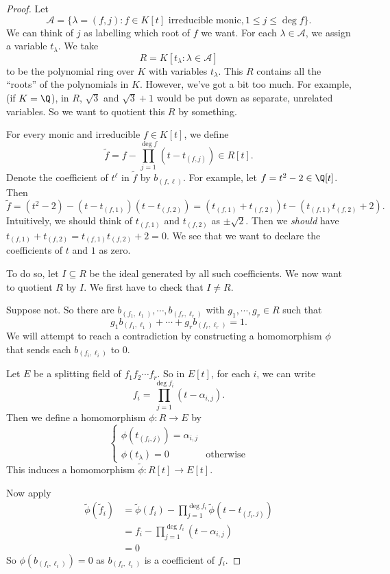 \documentclass[a4paper]{article}
\begin{document}
\begin{proof}
  Let
  \[
    \mathcal{A} = \{\lambda = (f, j): f\in K[t] \text{ irreducible monic}, 1 \leq j \leq \deg f\}.
  \]
  We can think of $j$ as labelling which root of $f$ we want. For each $\lambda \in \mathcal{A}$, we assign a variable $t_\lambda$. We take
  \[
    R = K[t_\lambda: \lambda \in \mathcal{A}]
  \]
  to be the polynomial ring over $K$ with variables $t_\lambda$. This $R$ contains all the ``roots'' of the polynomials in $K$. However, we've got a bit too much. For example, (if $K = \Q$), in $R$, $\sqrt{3}$ and $\sqrt{3} + 1$ would be put down as separate, unrelated variables. So we want to quotient this $R$ by something.

  For every monic and irreducible $f \in K[t]$, we define
  \[
    \tilde{f} = f  - \prod_{j = 1}^{\deg f} (t - t_{(f, j)}) \in R[t].
  \]
  Denote the coefficient of $t^\ell$ in $\tilde{f}$ by $b_{(f, \ell)}$. For example, let $f = t^2 - 2 \in \Q[t]$. Then
  \[
    \tilde{f} = (t^2 - 2) - (t - t_{(f, 1)})(t - t_{(f, 2)}) = (t_{(f, 1)} + t_{(f, 2)})t - (t_{(f, 1)}t_{(f, 2)} + 2).
  \]
  Intuitively, we should think of $t_{(f, 1)}$ and $t_{(f, 2)}$ as $\pm \sqrt{2}$. Then we \emph{should} have $t_{(f, 1)} + t_{(f, 2)} = t_{(f, 1)}t_{(f, 2)} + 2 = 0$. We see that we want to declare the coefficients of $t$ and $1$ as zero.

  To do so, let $I\subseteq R$ be the ideal generated by all such coefficients. We now want to quotient $R$ by $I$. We first have to check that $I\not= R$.

  Suppose not. So there are $b_{(f_1, \ell_1)}, \cdots, b_{(f_r, \ell_r)}$ with $g_1, \cdots, g_r \in R$ such that
  \[
    g_1 b_{(f_1, \ell_1)} + \cdots + g_r b_{(f_r, \ell_r)} = 1.\tag{$*$}
  \]
  We will attempt to reach a contradiction by constructing a homomorphism $\phi$ that sends each $b_{(f_i, \ell_i)}$ to $0$.

  Let $E$ be a splitting field of $f_1f_2\cdots f_r$. So in $E[t]$, for each $i$, we can write
  \[
    f_i = \prod_{j = 1}^{\deg f_i} (t - \alpha_{i, j}).
  \]
  Then we define a homomorphism $\phi: R \to E$ by
  \[
    \begin{cases}
      \phi(t_{(f_i, j)}) = \alpha_{i, j}\\
      \phi(t_\lambda) = 0 & \text{otherwise}
    \end{cases}
  \]
  This induces a homomorphism $\tilde{\phi}: R[t] \to E[t]$.

  Now apply
  \begin{align*}
    \tilde{\phi}(\tilde{f}_i) &= \tilde{\phi}(f_i) - \prod_{j = 1}^{\deg f_i} \tilde{\phi}(t - t_{(f_i, j)})\\
    &= f_i - \prod_{j = 1}^{\deg f_i} (t - \alpha_{i, j})\\
    &= 0
  \end{align*}
  So $\phi(b_{(f_i, \ell_i)}) = 0$ as $b_{(f_i, \ell_i)}$ is a coefficient of $f_i$.


\end{proof}
\end{document}
